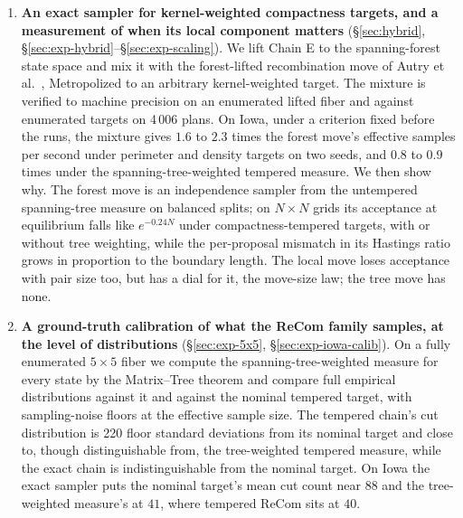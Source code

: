 \documentclass[11pt]{article}
\begin{document}
\begin{enumerate}
  \item \textbf{An exact sampler for kernel-weighted compactness
    targets, and a measurement of when its local component matters}
    (\S\ref{sec:hybrid}, \S\ref{sec:exp-hybrid}--\S\ref{sec:exp-scaling}).
    We lift Chain E to the spanning-forest state space and mix it with
    the forest-lifted recombination move of Autry et
    al.~\cite{autry2023metropolized}, Metropolized to an arbitrary
    kernel-weighted target. The mixture is verified to machine
    precision on an enumerated lifted fiber and against enumerated
    targets on 4\,006 plans. On Iowa, under a criterion fixed before
    the runs, the mixture gives $1.6$ to $2.3$ times the forest move's
    effective samples per second under perimeter and density targets
    on two seeds, and $0.8$ to $0.9$ times under the
    spanning-tree-weighted tempered measure. We then show why. The
    forest move is an independence sampler from the untempered
    spanning-tree measure on balanced splits; on $N \times N$ grids its
    acceptance at equilibrium falls like $e^{-0.24 N}$ under
    compactness-tempered targets, with or without tree weighting, while
    the per-proposal mismatch in its Hastings ratio grows in
    proportion to the boundary length. The local move loses
    acceptance with pair size too, but has a dial for it, the
    move-size law; the tree move has none.

  \item \textbf{A ground-truth calibration of what the ReCom family
    samples, at the level of distributions}
    (\S\ref{sec:exp-5x5}, \S\ref{sec:exp-iowa-calib}). On a fully
    enumerated $5 \times 5$ fiber we compute the spanning-tree-weighted
    measure for every state by the Matrix--Tree theorem and compare full
    empirical distributions against it and against the nominal tempered
    target, with sampling-noise floors at the effective sample size.
    The tempered chain's cut distribution is 220 floor standard
    deviations from its nominal target and close to, though
    distinguishable from, the tree-weighted tempered measure, while the
    exact chain is indistinguishable from the nominal target. On Iowa
    the exact sampler puts the nominal target's mean cut count near
    $88$ and the tree-weighted measure's at $41$, where tempered ReCom
    sits at $40$.
\end{enumerate}
\end{document}
